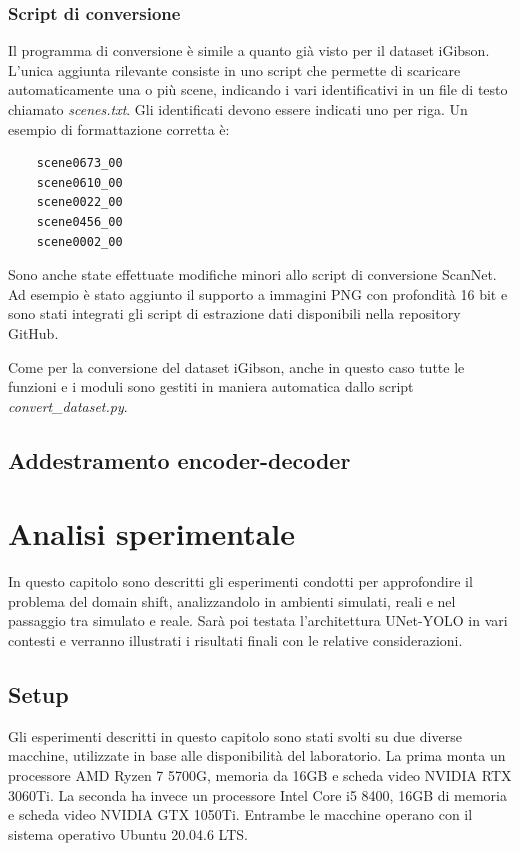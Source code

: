 \documentclass[12pt]{report}
\begin{document}
\subsection{Script di conversione}
\label{chap:script_di_conversione_scannet}

Il programma di conversione è simile a quanto già visto per il dataset iGibson. L'unica aggiunta rilevante consiste in uno script che permette di scaricare automaticamente una o più scene, indicando i vari identificativi in un file di testo chiamato \textit{scenes.txt}. Gli identificati devono essere indicati uno per riga. Un esempio di formattazione corretta è:

\begin{verbatim}
	scene0673_00
	scene0610_00
	scene0022_00
	scene0456_00
	scene0002_00
\end{verbatim}

Sono anche state effettuate modifiche minori allo script di conversione ScanNet. Ad esempio è stato aggiunto il supporto a immagini PNG con profondità 16 bit e sono stati integrati gli script di estrazione dati disponibili nella repository GitHub.

Come per la conversione del dataset iGibson, anche in questo caso tutte le funzioni e i moduli sono gestiti in maniera automatica dallo script \textit{convert\_dataset.py}.

\section{Addestramento encoder-decoder}
\label{chap:addestramento_encoder_decoder}

\chapter{Analisi sperimentale}
\label{chap:analisi}

In questo capitolo sono descritti gli esperimenti condotti per approfondire il problema del domain shift, analizzandolo in ambienti simulati, reali e nel passaggio tra simulato e reale. Sarà poi testata l'architettura UNet-YOLO in vari contesti e verranno illustrati i risultati finali con le relative considerazioni.

\section{Setup}
\label{chap:setup}

Gli esperimenti descritti in questo capitolo sono stati svolti su due diverse macchine, utilizzate in base alle disponibilità del laboratorio. La prima monta un processore AMD Ryzen 7 5700G, memoria da 16GB e scheda video NVIDIA RTX 3060Ti. La seconda ha invece un processore Intel Core i5 8400, 16GB di memoria e scheda video NVIDIA GTX 1050Ti. Entrambe le macchine operano con il sistema operativo Ubuntu 20.04.6 LTS.
\end{document}
